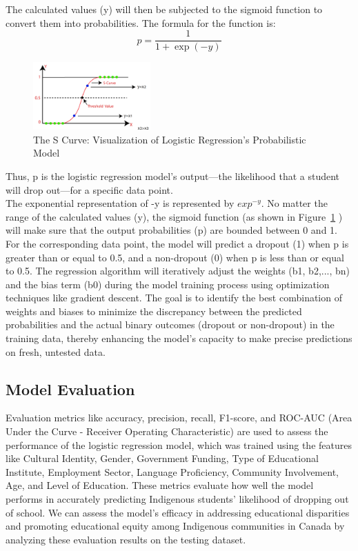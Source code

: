 \documentclass[conference]{IEEEtran}
\begin{document}
The calculated values (y) will then be subjected to the sigmoid function to convert them into probabilities. The formula for the function is:
\begin{equation}
p = \frac{1}{1 + \exp(-y)}
\end{equation}

\begin{figure}
	\centering 
	\includegraphics[width=0.4\textwidth, angle=0]{images/Picture3.png}	
	\caption{The S Curve: Visualization of Logistic Regression's Probabilistic Model} 
	\label{fig_mom0}
\end{figure}

Thus, p is the logistic regression model's output—the likelihood that a student will drop out—for a specific data point.\\
The exponential representation of -y is represented by ${exp^{-y}}$.
No matter the range of the calculated values (y), the sigmoid function (as shown in Figure~\ref{fig_mom0} \cite{r19}) will make sure that the output probabilities (p) are bounded between 0 and 1. For the corresponding data point, the model will predict a dropout (1) when p is greater than or equal to 0.5, and a non-dropout (0) when p is less than or equal to 0.5.
The regression algorithm will iteratively adjust the weights (b1, b2,..., bn) and the bias term (b0) during the model training process using optimization techniques like gradient descent. The goal is to identify the best combination of weights and biases to minimize the discrepancy between the predicted probabilities and the actual binary outcomes (dropout or non-dropout) in the training data, thereby enhancing the model's capacity to make precise predictions on fresh, untested data.

\subsection{\textbf{Model Evaluation}}
Evaluation metrics like accuracy, precision, recall, F1-score, and ROC-AUC (Area Under the Curve - Receiver Operating Characteristic) are used to assess the performance of the logistic regression model, which was trained using the features like Cultural Identity, Gender, Government Funding, Type of Educational Institute, Employment Sector, Language Proficiency, Community Involvement, Age, and Level of Education. These metrics evaluate how well the model performs in accurately predicting Indigenous students' likelihood of dropping out of school. We can assess the model's efficacy in addressing educational disparities and promoting educational equity among Indigenous communities in Canada by analyzing these evaluation results on the testing dataset.
\end{document}
